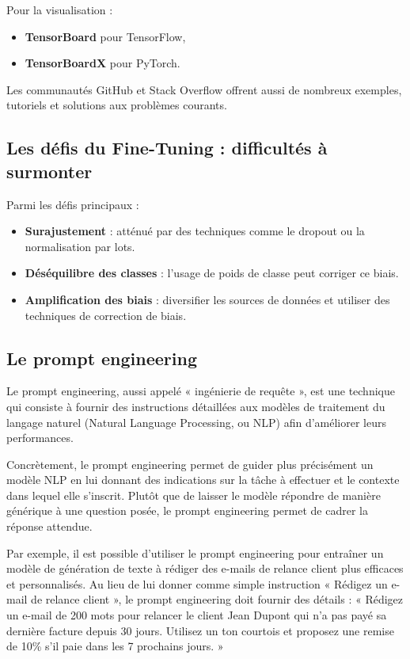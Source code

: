 Pour la visualisation :
\begin{itemize}
	\item \textbf{TensorBoard} pour TensorFlow,

	\item \textbf{TensorBoardX} pour PyTorch.
\end{itemize}

Les communautés GitHub et Stack Overflow offrent aussi de nombreux exemples,
tutoriels et solutions aux problèmes courants.

\subsection*{Les défis du Fine-Tuning : difficultés à surmonter}
Parmi les défis principaux :
\begin{itemize}
	\item \textbf{Surajustement} : atténué par des techniques comme le dropout ou
		la normalisation par lots.

	\item \textbf{Déséquilibre des classes} : l’usage de poids de classe peut
		corriger ce biais.

	\item \textbf{Amplification des biais} : diversifier les sources de données et
		utiliser des techniques de correction de biais.
\end{itemize}
\subsection{Le prompt engineering }

Le prompt engineering, aussi appelé « ingénierie de requête », est une technique
qui consiste à fournir des instructions détaillées aux modèles de traitement du langage
naturel (Natural Language Processing, ou NLP) afin d’améliorer leurs
performances.

Concrètement, le prompt engineering permet de guider plus précisément un modèle NLP
en lui donnant des indications sur la tâche à effectuer et le contexte dans lequel
elle s’inscrit. Plutôt que de laisser le modèle répondre de manière générique à
une question posée, le prompt engineering permet de cadrer la réponse attendue.

Par exemple, il est possible d’utiliser le prompt engineering pour entraîner un
modèle de génération de texte à rédiger des e-mails de relance client plus
efficaces et personnalisés. Au lieu de lui donner comme simple instruction « Rédigez
un e-mail de relance client », le prompt engineering doit fournir des détails :
« Rédigez un e-mail de 200 mots pour relancer le client Jean Dupont qui n’a pas
payé sa dernière facture depuis 30 jours. Utilisez un ton courtois et proposez une
remise de 10\% s’il paie dans les 7 prochains jours. »


